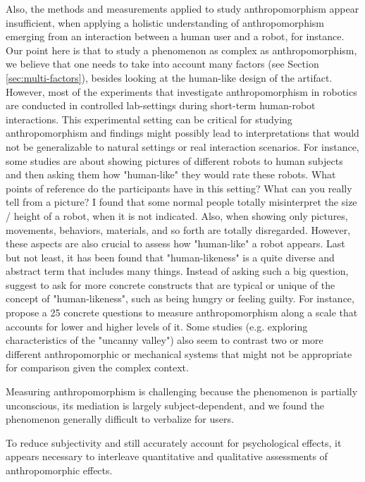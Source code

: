 \documentclass{frontiersSCNS} %
\begin{document}
Also, the methods and measurements applied to study anthropomorphism appear insufficient, when applying a holistic understanding of anthropomorphism emerging from an interaction between a human user and a robot, for instance. Our point here is that to study a phenomenon as complex as anthropomorphism, we believe that one needs to take into account many factors (see Section \ref{sec:multi-factors}), besides looking at the human-like design of the artifact.
However, most of the
experiments that investigate anthropomorphism in robotics are conducted in
controlled lab-settings during short-term human-robot interactions. This
experimental setting can be critical for studying
anthropomorphism and findings might possibly lead to interpretations that would not be generalizable to natural settings or real interaction scenarios. For instance, some studies are about showing pictures of different robots to human subjects and then asking them how "human-like" they would rate these robots. What points of reference do the participants have in this setting? What can you really tell from a picture? I found that some normal people totally misinterpret the size / height of a robot, when it is not indicated. Also, when showing only pictures, movements, behaviors, materials, and so forth are totally disregarded. However, these aspects are also crucial to assess how "human-like" a robot appears. Last but not least, it has been found that "human-likeness" is a quite diverse and abstract term that includes many things. Instead of asking such a big question, \cite{kahn_jr._robotic_2006} suggest to ask for more concrete constructs that are typical or unique of the concept of "human-likeness", such as being hungry or feeling guilty. For instance, \cite{ruijten_introducing_2014} propose a 25 concrete questions to measure anthropomorphism along a scale that accounts for lower and higher levels of it.
Some studies (e.g. exploring characteristics of the "uncanny valley") also seem to contrast two or
more different anthropomorphic or mechanical systems that might not be
appropriate for comparison given the complex context. 


Measuring anthropomorphism is challenging because the phenomenon is partially
unconscious, its mediation is largely subject-dependent, and we found the
phenomenon generally difficult to verbalize for users.

To reduce subjectivity and still accurately account for psychological effects,
it appears necessary to interleave quantitative and qualitative assessments of
anthropomorphic effects.
\end{document}
